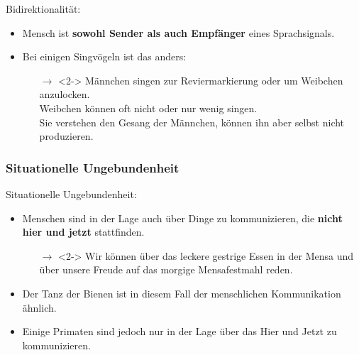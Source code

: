 \begin{frame}{Bidirektionalität:}

	\begin{itemize}
		\item[]
		\item<1-> Mensch ist \textbf{sowohl Sender als auch Empfänger} eines Sprachsignals.
		\item[]
		\item<2-> Bei einigen Singvögeln ist das anders:
		
		\begin{itemize}
			\item[]
			\item[$\rightarrow$]<2-> Männchen singen zur Reviermarkierung oder um
                          Weibchen anzulocken.\\
                         Weibchen können oft nicht oder nur wenig singen.\\
                         Sie verstehen den Gesang der Männchen, können ihn aber selbst nicht produzieren.
		\end{itemize}
			
	\end{itemize}

\end{frame}


\subsubsection{Situationelle Ungebundenheit}

\begin{frame}{Situationelle Ungebundenheit:}
	
	\begin{itemize}
		\item[]
		\item<1-> Menschen sind in der Lage auch über Dinge zu kommunizieren, die \textbf{nicht hier und jetzt} stattfinden.
		
		\begin{itemize}
			\item[]
			\item[$\rightarrow$]<2-> Wir können über das leckere gestrige Essen in der Mensa und über unsere Freude auf das morgige Mensafestmahl reden.
		\end{itemize}
		
		\item[]
		\item<3-> Der Tanz der Bienen ist in diesem Fall der menschlichen Kommunikation ähnlich.
		\item[]
		\item<3-> Einige Primaten sind jedoch nur in der Lage über das Hier und Jetzt zu kommunizieren.
	\end{itemize}
		
\end{frame}


